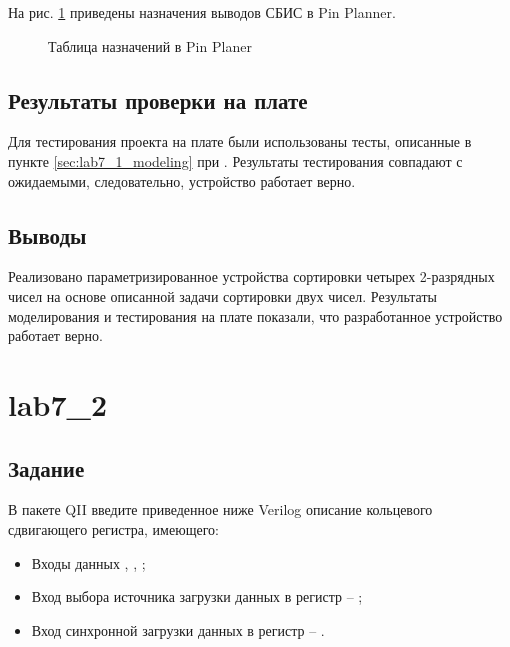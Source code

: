 На рис. \ref{fig:lab7_1_pins} приведены назначения выводов СБИС в Pin Planner.

\begin{figure}[H]
\begin{center}
	\caption{Таблица назначений в Pin Planer}
	\label{fig:lab7_1_pins}
\end{center}
\end{figure}

\subsection{Результаты проверки на плате}

Для тестирования проекта на плате были использованы тесты, описанные в пункте \ref{sec:lab7_1_modeling} при . Результаты тестирования совпадают с ожидаемыми, следовательно, устройство работает верно.

\subsection{Выводы}

Реализовано параметризированное устройства сортировки четырех 2-разрядных чисел на основе описанной задачи сортировки двух чисел. Результаты моделирования и тестирования на плате показали, что разработанное устройство работает верно.

\newpage

\section{lab7\_2}

\subsection{Задание}

В пакете QII введите приведенное ниже Verilog описание кольцевого сдвигающего регистра, имеющего:
\begin{itemize}
	\item Входы данных , , ;
	\item Вход выбора источника загрузки данных в регистр -- ;
	\item Вход синхронной загрузки данных в регистр -- .
\end{itemize}

%

